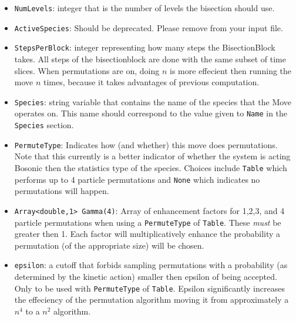 \documentclass{book}
\begin{document}
\begin{itemize}

  \item \texttt{NumLevels}: integer that is the number of levels the
  bisection should use.
   
  \item \texttt{ActiveSpecies}: Should be deprecated. Please remove
  from your input file. 

  \item \texttt{StepsPerBlock}: integer representing how many steps
  the BisectionBlock takes.  All steps of the bisectionblock are done
  with the same subset of time slices.  When permutations are on, doing $n$
   is more effecient then running the move $n$
  times, because it takes advantages of previous computation.  

  
   \item \texttt{Species}: string variable that contains the name of
   the species that the Move operates on.  This name should correspond
   to the value given to \texttt{Name} in the \texttt{Species}
   section.


   \item \texttt{PermuteType}: Indicates how (and whether) this move
   does permutations.  Note that this currently is a better indicator
   of whether the system is acting Bosonic then the statistics type of
   the species.  Choices include \texttt{Table} which performs up to 4
   particle permutations and \texttt{None} which indicates no
   permutations will happen.

   \item \texttt{Array<double,1> Gamma(4)}: Array of enhancement
     factors for 1,2,3, and 4 particle
     permutations when using a \texttt{PermuteType} of \texttt{Table}.
     These {\em must} be greater then 1.  Each factor will
     multiplicatively enhance the
     probability a permutation (of the appropriate size) will be chosen.
     
   \item \texttt{epsilon}: a cutoff that forbids sampling permutations with
     a probability (as determined by the kinetic action) smaller then epsilon 
     of being accepted.  Only to be used with \texttt{PermuteType} of
     \texttt{Table}. Epsilon significantly increases the 
     effeciency of the permutation algorithm moving it from
     approximately a $n^4$ to a $n^2$ algorithm. 

\end{itemize}
\end{document}
